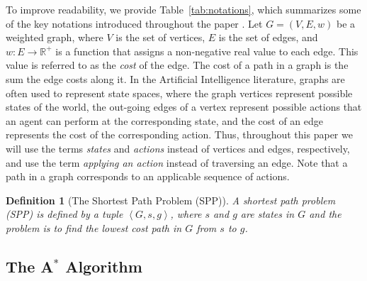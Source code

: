 \documentclass{aicom2e}
\newtheorem{definition}{Definition}
\newcommand{\astar}{A$^*$}
\newcommand{\tuple}[1]{\ensuremath{\left \langle #1 \right \rangle }}
\begin{document}
To improve readability, we provide Table~\ref{tab:notations}, which 
summarizes some of the key notations introduced throughout the paper .
Let $G=(V,E,w)$ be a weighted graph, where $V$ is the set of vertices, $E$ is
the set of edges, and $w:E\rightarrow \mathbb{R}^+$ is a function that assigns
a non-negative real value to each edge. This value is referred to as the {\em
cost} of the edge. The cost of a path in a graph is the sum the edge costs
along it. In the Artificial Intelligence literature, graphs are often used to
represent state spaces, where the graph vertices represent possible states of
the world, the out-going edges of a vertex represent possible actions that an
agent can perform at the corresponding state, and the cost of an edge
represents the cost of the corresponding action. Thus, throughout this paper we
will use the terms {\em states} and {\em actions} instead of vertices and
edges, respectively, and use the term {\em applying an action} instead of
traversing an edge. Note that a path in a graph corresponds to an applicable
sequence of actions.

\begin{definition}[The Shortest Path Problem (SPP)]
A shortest path problem (SPP) is defined by a tuple $\tuple{G,s,g}$, where $s$
and $g$ are states in $G$ and the problem is to find the lowest cost path in
$G$ from $s$ to $g$. \label{def:spp}
\end{definition}

\subsection{The \astar{} Algorithm}
\end{document}

